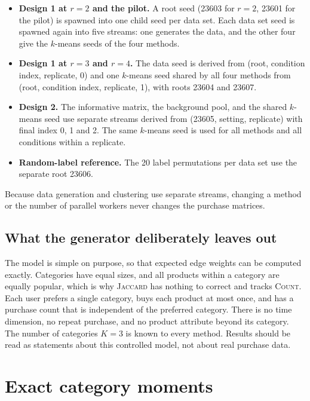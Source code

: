 \documentclass[12pt]{article}
\newcommand{\Count}{\textsc{Count}}
\newcommand{\Jac}{\textsc{Jaccard}}
\begin{document}
\begin{itemize}
  \item \textbf{Design 1 at $r=2$ and the pilot.} A root seed (23603 for $r=2$, 23601 for the pilot) is spawned into one child seed per data set. Each data set seed is spawned again into five streams: one generates the data, and the other four give the $k$-means seeds of the four methods.
  \item \textbf{Design 1 at $r=3$ and $r=4$.} The data seed is derived from (root, condition index, replicate, 0) and one $k$-means seed shared by all four methods from (root, condition index, replicate, 1), with roots 23604 and 23607.
  \item \textbf{Design 2.} The informative matrix, the background pool, and the shared $k$-means seed use separate streams derived from (23605, setting, replicate) with final index 0, 1 and 2. The same $k$-means seed is used for all methods and all conditions within a replicate.
  \item \textbf{Random-label reference.} The 20 label permutations per data set use the separate root 23606.
\end{itemize}

Because data generation and clustering use separate streams, changing a method or the number of parallel workers never changes the purchase matrices.

\subsection{What the generator deliberately leaves out}

The model is simple on purpose, so that expected edge weights can be computed exactly. Categories have equal sizes, and all products within a category are equally popular, which is why \Jac{} has nothing to correct and tracks \Count. Each user prefers a single category, buys each product at most once, and has a purchase count that is independent of the preferred category. There is no time dimension, no repeat purchase, and no product attribute beyond its category. The number of categories $K=3$ is known to every method. Results should be read as statements about this controlled model, not about real purchase data.

\section{Exact category moments}
\label{app:recurrence}
\end{document}
